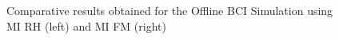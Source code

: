 \documentclass[11pt]{beamer}
\begin{document}
    \begin{frame}
   \begin{figure}[thpb]
      \centering
      \setlength\fboxsep{0pt}
	  \setlength\fboxrule{0.5pt}
      \caption{\centering Comparative results obtained for the Offline BCI Simulation using MI RH (left) and MI FM (right)}
      \label{figure3}
   \end{figure}  
    \end{frame}
    
\end{document}
